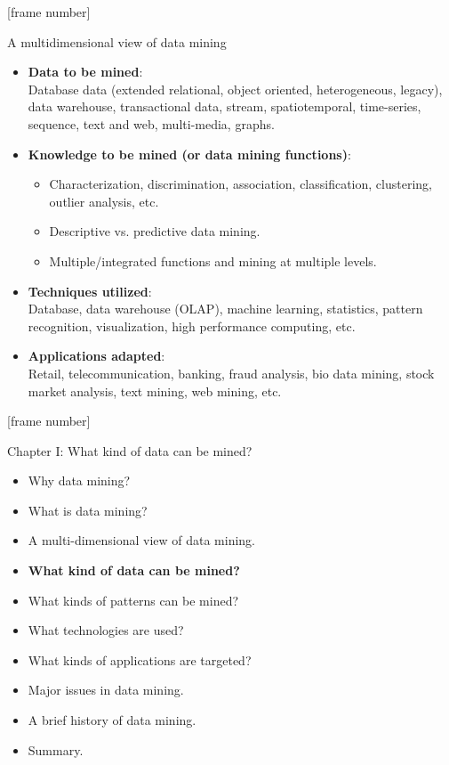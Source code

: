 \documentclass[aspectratio=169,t]{beamer}
\begin{document}
  {
    [frame number]
    \begin{frame}{A multidimensional view of data mining}
        \begin{itemize}
            \item \textbf{Data to be mined}:\\
                  \small{Database data (extended relational, object oriented, heterogeneous, legacy), data warehouse, transactional data, stream, spatiotemporal, time-series, sequence, text and web, multi-media, graphs.}
            \item \textbf{Knowledge to be mined (or data mining functions)}:\\
                  \begin{itemize}
                      \item Characterization, discrimination, association, classification, clustering, outlier analysis, etc.
                      \item Descriptive vs. predictive data mining.
                      \item Multiple/integrated functions and mining at multiple levels.
                  \end{itemize}
            \item \textbf{Techniques utilized}:\\
                  \small{Database, data warehouse (OLAP), machine learning, statistics, pattern recognition, visualization, high performance computing, etc.}
            \item \textbf{Applications adapted}:\\
                  \small{Retail, telecommunication, banking, fraud analysis, bio data mining, stock market analysis, text mining, web mining, etc.}
        \end{itemize}
    \end{frame}
  }

  {
    [frame number]
    \begin{frame}{Chapter I: What kind of data can be mined?}
        \begin{itemize}
            \item Why data mining?
            \item What is data mining?
            \item A multi-dimensional view of data mining.
            \item \textbf{What kind of data can be mined?}
            \item What kinds of patterns can be mined?
            \item What technologies are used?
            \item What kinds of applications are targeted?
            \item Major issues in data mining.
            \item A brief history of data mining.
            \item Summary.
        \end{itemize}
    \end{frame}
  }
\end{document}
